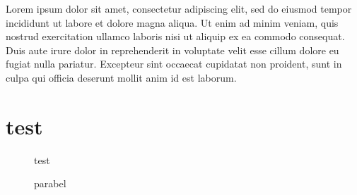 \documentclass{article}
\begin{document}
\tableofcontents

Lorem ipsum dolor sit amet, consectetur adipiscing elit, sed do eiusmod tempor incididunt ut labore et dolore magna aliqua. Ut enim ad minim veniam, quis nostrud exercitation ullamco laboris nisi ut aliquip ex ea commodo consequat. Duis aute irure dolor in reprehenderit in voluptate velit esse cillum dolore eu fugiat nulla pariatur. Excepteur sint occaecat cupidatat non proident, sunt in culpa qui officia deserunt mollit anim id est laborum.

\section{test}

\begin{figure}[htpb]
    \centering
    \caption{test}
\end{figure}


\begin{figure}[htpb]
    \centering
    \caption{parabel}
\end{figure}
\end{document}
